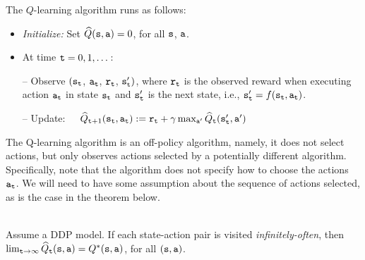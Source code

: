 The $Q$-learning algorithm runs as follows:
\begin{itemize}
\item {\em Initialize:} Set $\widehat{Q}({\tt s},{\tt a})=0$, for all ${\tt s}$, ${\tt a}$.
\item At time ${\tt t}=0,1,\dots$:

-- Observe $({\tt s}_{\tt t}$, ${\tt a}_{\tt t}$, ${\tt r}_{\tt t}$,
${\tt s}_{{\tt t}}')$, where ${\tt r}_{\tt t}$ is the observed reward
when executing action ${\tt a}_{\tt t}$ in state ${\tt s}_{\tt t}$ and
${\tt s}_{\tt t}'$ is the next state, i.e.,
${\tt s}_{\tt t}'=f({\tt s}_{\tt t},{\tt a}_{\tt t})$.

-- Update:\ \ \
$\widehat{Q}_{{\tt t}+1}({\tt s}_{\tt t},{\tt a}_{\tt t}) :=
{\tt r}_{\tt t}+\gamma \max_{{\tt a}'}
\widehat{Q}_{\tt t}({\tt s}_{{\tt t}}',{\tt a}')$
\end{itemize}

The Q-learning algorithm is an off-policy algorithm, namely, it does
not select actions, but only observes actions selected by a
potentially different algorithm. Specifically, note that the
algorithm does not specify how to choose the actions
${\tt a}_{\tt t}$. We will need to have some assumption about the
sequence of actions selected, as is the case in the theorem below.

\begin{theorem}\ \\
Assume a DDP model.
If each state-action pair is visited {\em infinitely-often}, then
$\lim_{{\tt t}\to\infty}\widehat{Q}_{\tt t}({\tt s},{\tt a})=Q^*({\tt s},{\tt a})$,
for all $({\tt s},{\tt a})$.
\end{theorem}

